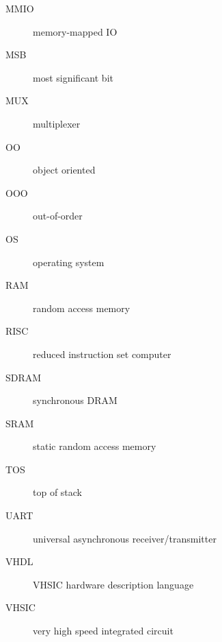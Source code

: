 \documentclass[%
    10pt,
    headinclude, footexclude,
    openright, %
    notitlepage,
    cleardoubleempty,
    headsepline,
    pointlessnumbers,
    bibtotoc, idxtotoc,
    ]{scrbook}
\begin{document}
\begin{description}
\item [MMIO] memory-mapped IO
\item [MSB] most significant bit
\item [MUX] multiplexer
\item [OO] object oriented
\item [OOO] out-of-order
\item [OS] operating system
\item [RAM] random access memory
\item [RISC] reduced instruction set computer
\item [SDRAM] synchronous DRAM
\item [SRAM] static random access memory
\item [TOS] top of stack
\item [UART] universal asynchronous receiver/transmitter
\item [VHDL] VHSIC hardware description language
\item [VHSIC] very high speed integrated circuit
\end{description}






\hypertarget{index}{}
\printindex
\end{document}
